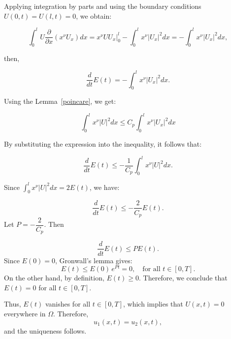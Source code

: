 \documentclass[reqno]{amsart}
\theoremstyle{definition}
\numberwithin{equation}{section}
\begin{document}
Applying integration by parts and using the boundary conditions  $U(0,t)=U(l,t)=0$, we obtain:


\begin{equation*}
    \int_0^l U\frac{\partial}{\partial x} \left(x^{\nu}U_x\right)dx=\left.x^{\nu} U U_x\right|_0 ^l -\int_0^l x^{\nu} |U_x|^2dx=-\int_0^l x^{\nu} |U_x|^2dx,
\end{equation*}

then, 

\begin{equation*}
    \frac{d}{dt}E(t)=-\int_0^l x^{\nu} |U_x|^2dx.
\end{equation*}

Using the Lemma~\ref{poincare}, we get:

\begin{equation*}
    \int_0^l x^\nu|U|^2 d x \leq C_p \int_0^l x^\nu\left|U_x\right|^2 d x
\end{equation*}

By substituting the expression into the inequality, it follows that:

\begin{equation*}
    \frac{d}{dt}E(t)\leq-\frac{1}{C_p}\int_0^l x^{\nu} |U|^2dx.
\end{equation*}

Since $\int_0^lx^{\nu}|U|^2dx=2E(t)$, we have: 

\begin{equation*}
    \frac{d}{dt}E(t)\leq -\frac{2}{C_p}E(t).
\end{equation*}
Let $P=-\dfrac{2}{C_p}$. Then 

\begin{equation*}
    \frac{d}{dt}E(t)\leq PE(t).
\end{equation*}
Since $E(0)=0$, Gronwall's lemma gives:
\begin{equation*}
    E(t) \leq E(0)\, e^{Pt} = 0, \quad \text{for all } t\in[0,T].
\end{equation*}
On the other hand, by definition, $E(t) \geq 0$. 
Therefore, we conclude that $E(t) = 0$ for all $t\in[0,T]$.

Thus, $E(t)$ vanishes for all $t\in[0,T]$, which implies that $U(x,t)=0$ everywhere in $\Omega$. Therefore,
\begin{equation*}
    u_1(x,t)=u_2(x,t),
\end{equation*}
and the uniqueness follows.
\end{document}
